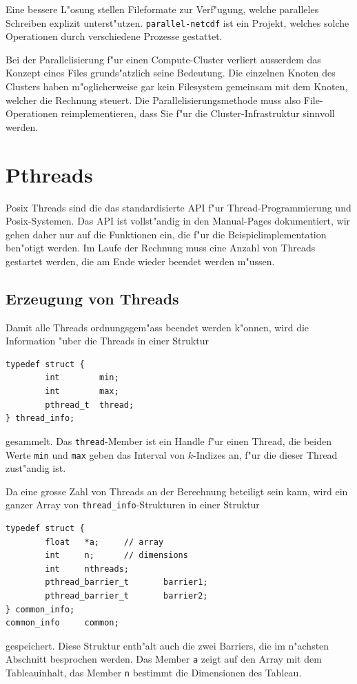 Eine bessere L"osung stellen Fileformate zur Verf"ugung, welche paralleles
Schreiben explizit unterst"utzen. {\tt parallel-netcdf} ist ein Projekt,
welches solche Operationen durch verschiedene Prozesse gestattet.

Bei der Parallelisierung f"ur einen Compute-Cluster verliert ausserdem
das Konzept eines Files grunds"atzlich seine Bedeutung.
Die einzelnen Knoten des Clusters haben m"oglicherweise gar kein Filesystem
gemeinsam mit dem Knoten, welcher die Rechnung steuert. 
Die Parallelisierungsmethode muss also File-Operationen reimplementieren,
dass Sie f"ur die Cluster-Infrastruktur sinnvoll werden.

\section{Pthreads}
Posix Threads sind die das standardisierte API f"ur Thread-Programmierung
und Posix-Systemen.
Das API ist vollst"andig in den Manual-Pages dokumentiert, wir gehen
daher nur auf die Funktionen ein, die f"ur die Beispielimplementation
ben"otigt werden. Im Laufe der Rechnung muss eine Anzahl von Threads
gestartet werden, die am Ende wieder beendet werden m"ussen.

\subsection{Erzeugung von Threads}
Damit alle Threads ordnungsgem"ass beendet werden k"onnen, wird die Information
"uber die Threads in einer Struktur
\begin{verbatim}
typedef struct {
        int        min;
        int        max;
        pthread_t  thread;
} thread_info;
\end{verbatim}
gesammelt. Das {\tt thread}-Member ist ein Handle f"ur einen Thread, die
beiden Werte {\tt min} und {\tt max} geben das Interval von $k$-Indizes
an, f"ur die dieser Thread zust"andig ist.

Da eine grosse Zahl von Threads an der Berechnung beteiligt sein kann,
wird ein ganzer Array von \verb+thread_info+-Strukturen in einer
Struktur
\begin{verbatim}
typedef struct {
        float   *a;     // array
        int     n;      // dimensions
        int     nthreads;
        pthread_barrier_t       barrier1;
        pthread_barrier_t       barrier2;
} common_info;
common_info     common;
\end{verbatim}
gespeichert. Diese Struktur enth"alt auch die zwei Barriers, die
im n"achsten Abschnitt besprochen werden. Das Member {\tt a}
zeigt auf den Array mit dem Tableauinhalt, das Member {\tt n} 
bestimmt die Dimensionen des Tableau.

